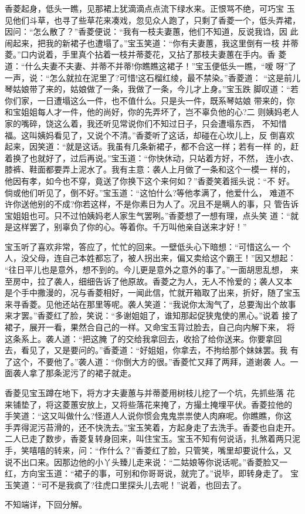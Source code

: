 香菱起身，低头一瞧，见那裙上犹滴滴点点流下绿水来。正恨骂不绝，可巧宝
玉见他们斗草，也寻了些草花来凑戏，忽见众人跑了，只剩了香菱一个，低头弄裙，
因问：“怎么散了？”香菱便说：“我有一枝夫妻蕙，他们不知道，反说我诌，因
此闹起来，把我的新裙子也遭塌了。”宝玉笑道：“你有夫妻蕙，我这里倒有一枝
并蒂菱。”口内说着，手里真个拈着一枝并蒂菱花，又拈了那枝夫妻蕙在手内。香
菱道：“什么夫妻不夫妻、并蒂不并蒂!你瞧瞧这裙子！”宝玉便低头一瞧，“嗳
呀”了一声，说：“怎么就拉在泥里了?可惜!这石榴红绫，最不禁染。”香菱道：
“这是前儿琴姑娘带了来的，姑娘做了一条，我做了一条，今儿才上身。”宝玉跌
脚叹道：“若你们家，一日遭塌这么一件，也不值什么。只是头一件，既系琴姑娘
带来的，你和宝姐姐每人才一件，他的尚好，你的先弄坏了，岂不辜负他的心?二
则姨妈老人家的嘴碎，饶这么着，我还听见常说你们不知过日子，只会遭塌东西，
不知惜福。这叫姨妈看见了，又说个不清。”香菱听了这话，却碰在心坎儿上，反
倒喜欢起来，因笑道：“就是这话。我虽有几条新裙子，都不合这一样；若有一样
的，赶着换了也就好了，过后再说。”宝玉道：“你快休动，只站着方好，不然，
连小衣、膝裤、鞋面都要弄上泥水了。我有主意：袭人上月做了一条和这个一模一
样的，他因有孝，如今也不穿，竟送了你换下这个来何如？”香菱笑着摇头说：“不
好。倘或他们听见了，倒不好。”宝玉道：“这怕什么?等他孝满了，他爱什么，
难道不许你送他别的不成?你若这样，不是你素日为人了。况且不是瞒人的事，只
管告诉宝姐姐也可。只不过怕姨妈老人家生气罢咧。”香菱想了一想有理，点头笑
道：“就是这样罢了，别辜负了你的心。等着你。千万叫他亲自送来才好！”

宝玉听了喜欢非常，答应了，忙忙的回来。一壁低头心下暗想：“可惜这么一
个人，没父母，连自己本姓都忘了，被人拐出来，偏又卖给这个霸王！”因又想起：
“往日平儿也是意外，想不到的。今儿更是意外之意外的事了。”一面胡思乱想，
来至房中，拉了袭人，细细告诉了他原故。香菱之为人，无人不怜爱的；袭人又本
是个手中撒漫的，况与香菱相好，一闻此信，忙就开箱取了出来，折好，随了宝玉
来寻香菱。见他还站在那里等呢。袭人笑道：“我说你太淘气了，总要淘出个故事
来才罢。”香菱红了脸，笑说：“多谢姐姐了，谁知那起促狭鬼使的黑心。”说着
接了裙子，展开一看，果然合自己的一样。又命宝玉背过脸去，自己向内解下来，
将这条系上。袭人道：“把这腌了的交给我拿回去，收拾了给你送来。你要拿回
去，看见了，又是要问的。”香菱道：“好姐姐，你拿去，不拘给那个妹妹罢。我
有了这个，不要他了。”袭人道：“你倒大方的很。”香菱忙又拜了两拜，道谢袭
人。一面袭人拿了那条泥污了的裙子就走。

香菱见宝玉蹲在地下，将方才夫妻蕙与并蒂菱用树枝儿挖了一个坑，先抓些落
花来铺垫了，将这菱蕙安放上，又将些落花来掩了，方撮土掩埋平伏。香菱拉他的
手笑道：“这又叫做什么?怪道人人说你惯会鬼鬼祟祟使人肉麻呢。你瞧瞧，你这
手弄得泥污苔滑的，还不快洗去。”宝玉笑着，方起身走了去洗手。香菱也自走开。
二人已走了数步，香菱复转身回来，叫住宝玉。宝玉不知有何说话，扎煞着两只泥
手，笑嘻嘻的转来，问：“作什么？”香菱红了脸，只管笑，嘴里却要说什么，又
说不出口来。因那边他的小丫头臻儿走来说：“二姑娘等你说话呢。”香菱脸又一
红，方向宝玉道：“裙子的事，可别和你哥哥说，就完了。”说毕，即转身走了。
宝玉笑道：“可不是我疯了?往虎口里探头儿去呢！”说着，也回去了。

不知端详，下回分解。